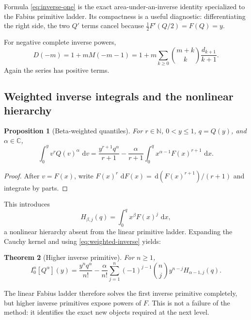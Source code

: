 \documentclass[11pt,oneside]{article}
\numberwithin{equation}{section}
\newtheorem{theorem}{Theorem}[section]
\newtheorem{proposition}[theorem]{Proposition}
\theoremstyle{definition}
\theoremstyle{remark}
\newcommand{\C}{\mathbb C}
\newcommand{\N}{\mathbb N}
\newcommand{\dd}{\,\mathrm d}
\begin{document}
Formula \eqref{eq:inverse-one} is the exact area-under-an-inverse identity specialized to the
Fabius primitive ladder.  Its compactness is a useful diagnostic: differentiating the right
side, the two $Q'$ terms cancel because
$\tfrac12F'(Q/2)=F(Q)=y$.

For negative complete inverse powers,
\begin{equation}
 D(-m)=1+mM(-m-1)
 =1+m\sum_{k\ge0}\binom{m+k}{k}\frac{d_{k+1}}{k+1}.           \label{eq:inverse-negative-complete}
\end{equation}
Again the series has positive terms.

\subsection{Weighted inverse integrals and the nonlinear hierarchy}

\begin{proposition}[Beta-weighted quantiles]
\label{prop:weighted-inverse}
For $r\in\N$, $0<y\le1$, $q=Q(y)$, and $\alpha\in\C$,
\begin{equation}
 \boxed{
 \int_0^yv^rQ(v)^\alpha\,\dd v
 =\frac{y^{r+1}q^\alpha}{r+1}
 -\frac{\alpha}{r+1}\int_0^qx^{\alpha-1}F(x)^{r+1}\,\dd x.}
 \label{eq:weighted-inverse}
\end{equation}
\end{proposition}

\begin{proof}
After $v=F(x)$, write $F(x)^r\,\dd F(x)=\dd(F(x)^{r+1})/(r+1)$ and integrate by parts.
\end{proof}

This introduces
\begin{equation}
 H_{\beta,j}(q)=\int_0^qx^\beta F(x)^j\,\dd x,                \label{eq:H-hierarchy}
\end{equation}
a nonlinear hierarchy absent from the linear primitive ladder.  Expanding the Cauchy kernel
and using \eqref{eq:weighted-inverse} yields:

\begin{theorem}[Higher inverse primitive]
\label{thm:inverse-nfold}
For $n\ge1$,
\begin{equation}
 \boxed{
 I_0^n[Q^\alpha](y)
 =\frac{y^nq^\alpha}{n!}
 -\frac{\alpha}{n!}\sum_{j=1}^{n}(-1)^{j-1}\binom nj
 y^{n-j}H_{\alpha-1,j}(q).}
 \label{eq:inverse-nfold}
\end{equation}
\end{theorem}

The linear Fabius ladder therefore solves the first inverse primitive completely, but higher
inverse primitives expose powers of $F$.  This is not a failure of the method: it identifies
the exact new objects required at the next level.
\end{document}
